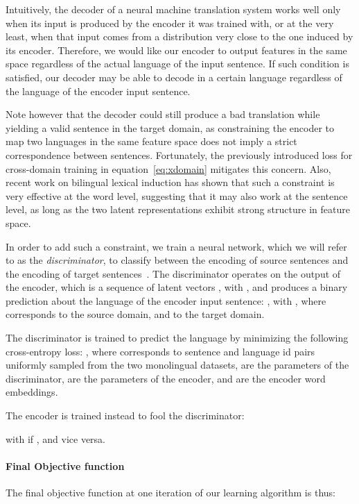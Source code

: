 \documentclass{article} \usepackage{iclr2018_conference,times}
\begin{document}
Intuitively, the decoder of a neural machine translation system works well only when its input is produced by the encoder it was trained with, or at the very least, when that input comes from a distribution very close to the one induced by its encoder. Therefore, we would like our encoder to output features in the same space regardless of the actual language of the input sentence. If such condition is satisfied, our decoder may be able to decode in a certain language regardless of the language of the encoder input sentence.

Note however that the decoder could still produce a bad translation while yielding a valid sentence in the target domain, as constraining the encoder to map two languages in the same feature space does not imply a strict correspondence between sentences. Fortunately, the previously introduced loss for cross-domain training in equation~\ref{eq:xdomain} mitigates this concern. Also, recent work on bilingual lexical induction has shown that such a constraint is very effective at the word level, suggesting that it may also work at the sentence level, as long as the two latent representations exhibit strong structure in feature space.

In order to add such a constraint, we train a neural network, which we will refer to as the \textit{discriminator}, to classify between the encoding of source sentences and the encoding of target sentences~\citep{ganin}. The discriminator operates on the output of the encoder, which is a sequence of latent vectors , with , and produces a binary prediction about the language of the encoder input sentence: , with , where  corresponds to the source domain, and  to the target domain. 

The discriminator is trained to predict the language by minimizing the following cross-entropy loss:
, where  corresponds to sentence and language id pairs uniformly sampled from the two monolingual datasets,  are the parameters of the discriminator,  are the parameters of the encoder, and  are the encoder word embeddings.

The encoder is trained instead to fool the discriminator:

with  if , and vice versa.

\paragraph{Final Objective function}
The final objective function at one iteration of our learning algorithm is thus:
\end{document}
